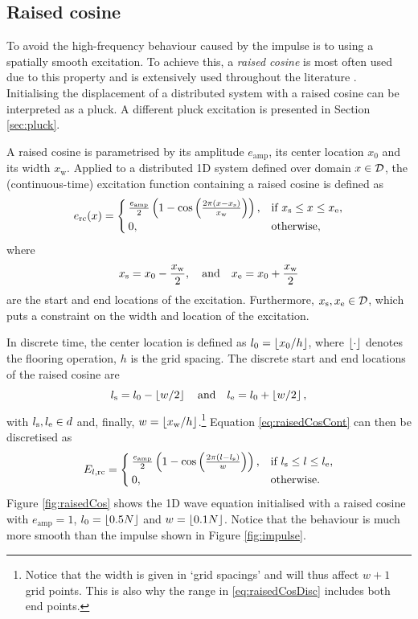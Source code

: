 \subsection{Raised cosine}\label{sec:raisedCosine}
To avoid the high-frequency behaviour caused by the impulse is to using a spatially smooth excitation. To achieve this, a \textit{raised cosine} is most often used due to this property and is extensively used throughout the literature \cite{theBible}. Initialising the displacement of a distributed system with a raised cosine can be interpreted as a pluck. A different pluck excitation is presented in Section \ref{sec:pluck}.

A raised cosine is parametrised by its amplitude $e_\text{amp}$, its center location $x_0$ and its width $x_\text{w}$. Applied to a distributed 1D system defined over domain $x\in \mathcal{D}$, the (continuous-time) excitation function containing a raised cosine is defined as 
\begin{equation}\label{eq:raisedCosCont}
    e_\text{rc}(x) = 
    \begin{cases}
        \frac{e_\text{amp}}{2}\left(1 - \cos\left(\frac{2\pi (x - x_{\text{s}})}{x_\text{w}}\right)\right), & \text{if } x_{\text{s}} \leq x \leq x_{\text{e}},\\
        0, & \text{otherwise},
    \end{cases}
\end{equation}
where 
\begin{equation}\label{eq:xsxe}
    x_{\text{s}} = x_0 - 
    \frac{x_\text{w}}{2}, \quad \text{and} \quad x_{\text{e}} = x_0 + \frac{x_\text{w}}{2}
\end{equation}
are the start and end locations of the excitation. Furthermore, $x_{\text{s}}, x_{\text{e}} \in \mathcal{D}$, which puts a constraint on the width and location of the excitation. 

In discrete time, the center location is defined as $l_0 = \floor[x_0 / h]$, where $\floor[\cdot]$ denotes the flooring operation, $h$ is the grid spacing. The discrete start and end locations of the raised cosine are
\begin{equation}\label{eq:lsle}
    l_\text{s} = l_0 - \floor[w/2]\qaq l_\etxt = l_0 + \floor[w/2],
\end{equation}
with $l_{\text{s}}, l_{\text{e}}\in d$ and, finally, $w = \floor[x_\text{w} / h]$.\footnote{Notice that the width is given in `grid spacings' and will thus affect $w+1$ grid points. This is also why the range in \eqref{eq:raisedCosDisc} includes both end points.} Equation \eqref{eq:raisedCosCont} can then be discretised as
\begin{equation}\label{eq:raisedCosDisc}
    E_{l, \text{rc}} =
    \begin{cases}
        \frac{e_\text{amp}}{2}\left(1 - \cos\left(\frac{2\pi (l - l_{\text{s}})}{w}\right)\right), & \text{if } l_{\text{s}} \leq l \leq l_{\text{e}},\\
        0, & \text{otherwise}.
    \end{cases}
\end{equation}
Figure \ref{fig:raisedCos} shows the 1D wave equation initialised with a raised cosine with $e_\text{amp} = 1$, $l_0 = \floor[0.5N]$ and $w = \floor[0.1N]$. Notice that the behaviour is much more smooth than the impulse shown in Figure \ref{fig:impulse}.

